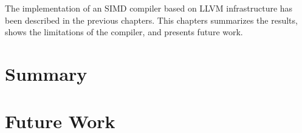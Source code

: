 The implementation of an SIMD compiler based on LLVM infrastructure has been described in the previous chapters. This chapters summarizes the results, shows the limitations of the compiler, and presents future work.

\section{Summary}


\section{Future Work}\label{sec:future_work}







